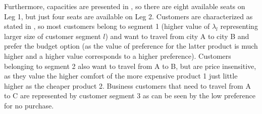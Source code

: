 Furthermore, capacities are presented in , so there are eight available seats on Leg 1, but just four seats are available on Leg 2. Customers are characterized as stated in , so most customers belong to segment 1 (higher value of $\lambda_l$ representing larger size of customer segment $l$) and want to travel from city A to city B and prefer the budget option (as the value of preference for the latter product is much higher and a higher value corresponds to a higher preference). Customers belonging to segment 2 also want to travel from A to B, but are price insensitive, as they value the higher comfort of the more expensive product 1 just little higher as the cheaper product 2. Business customers that need to travel from A to C are represented by customer segment 3 as can be seen by the low preference for no purchase. 

